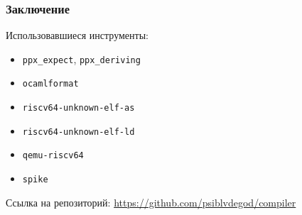 \documentclass{beamer}
\begin{document}
	\begin{frame}
		\frametitle{Заключение}
			Использовавшиеся инструменты:
			\begin{itemize}
				\item \lstinline|ppx_expect|, \lstinline|ppx_deriving|
				\item \lstinline|ocamlformat|
				\item \lstinline|riscv64-unknown-elf-as|
				\item \lstinline|riscv64-unknown-elf-ld|
				\item \lstinline|qemu-riscv64|
				\item \lstinline|spike|
			\end{itemize}
			Ссылка на репозиторий: \url{https://github.com/psiblvdegod/compiler}
	\end{frame}
\end{document}
